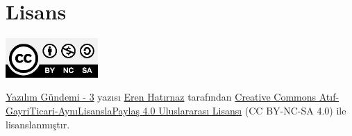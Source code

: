 \documentclass[11pt]{article}
\begin{document}
\section{Lisans}
\label{sec:org7c59a0f}
\begin{center}
\begin{center}
\includegraphics[height=1.5cm]{../../../img/CC_BY-NC-SA_4.0.png}
\end{center}

\href{yazilim-gundemi-03.pdf}{Yazılım Gündemi - 3} yazısı \href{https://erenhatirnaz.github.io}{Eren Hatırnaz} tarafından \href{http://creativecommons.org/licenses/by-nc-sa/4.0/}{Creative Commons
Atıf-GayriTicari-AynıLisanslaPaylaş 4.0 Uluslararası Lisansı} (CC BY-NC-SA 4.0)
ile lisanslanmıştır.
\end{center}
\end{document}
